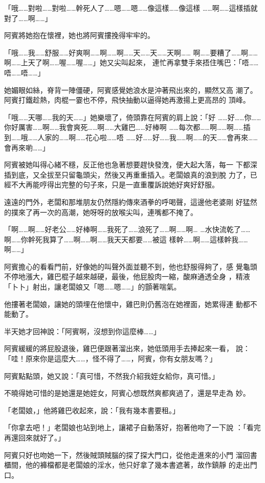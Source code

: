 「哦……對啦……對啦……幹死人了……嗯……嗯……像這樣……像這樣
……啊……這樣插就對了……啊……」

阿賓將她抱在懷裡，她也將阿賓摟挽得牢牢的。

「哦……我……舒服……好爽啊……啊……啊……天……天……天啊……
啊……要糟了……啊……啊……上天了啊……喔……喔……」她又尖叫起來，
連忙再拿雙手來捂住嘴巴：「唔……唔……唔……」

她媚眼如絲，脊背一陣僵硬，阿賓感覺她浪水是沖著飛出來的，顯然又高
潮了。阿賓打鐵趁熱，肉棍一霎也不停，飛快抽動以逼得她再激揚上更高昂的
頂峰。

「哦……天哪……我的天……」她樂壞了，倚頭靠在阿賓的肩上說：「好
……好……你……你好厲害……啊……我會爽死……啊……大雞巴……好棒啊
……每次都……啊……啊……插到……哦……人家的……啊……花心啦……唔
……好……好……我……啊……的天……會再來……會再來喲……」

阿賓被她叫得心緒不穩，反正他也急著想要趕快發洩，便大起大落，每一
下都深插到底，又全拔至只留龜頭尖，然後又再重重插入。老闆娘真的浪到脫
力了，已經不大再能哼得出完整的句子來，只是一直重覆訴說她好爽好舒服。

遠遠的門外，老闆和那堆朋友仍然隱約傳來酒拳的呼喝聲，這邊他老婆剛
好猛然的撲來了再一次的高潮，她呀呀的放喉尖叫，連嘴都不掩了。

「啊……啊……好老公……好棒啊……我死了……浪死了……啊……啊…
…水快流乾了……啊……你幹死我算了……啊……啊……我天天都要……被這
樣幹……啊……這樣幹我……啊……」

阿賓擔心的看看門前，好像她的叫聲外面並聽不到，他也舒服得夠了，感
覺龜頭不停地漲大，雞巴棍子越來越硬，最後，他屁股肉一縮，酸麻通透全身
，精液「卜卜」射出，讓老闆娘又「嗯……嗯……」的顫著喘氣。

他摟著老闆娘，讓她的頭埋在他懷中，雞巴則仍舊泡在她裡面，她累得連
動都不能動了。

半天她才回神說：「阿賓啊，沒想到你這麼棒……」

阿賓緩緩的將屁股退後，雞巴便跟著溜出來，她低頭用手去捧起來一看，
說：「哇！原來你是這麼大……，怪不得了……，阿賓，你有女朋友嗎？」

阿賓點點頭，她又說：「真可惜，不然我介紹我姪女給你，真可惜。」

不曉得她可惜的是她還是她姪女，阿賓心想既然爽都爽過了，還是早走為
妙。

「老闆娘，」他將雞巴收起來，說：「我有幾本書要租。」

「你拿去吧！」老闆娘也站到地上，讓裙子自動落好，抱著他吻了一下說
：「看完再還回來就好了。」

阿賓只好也吻她一下，然後賊頭賊腦的探了探大門口，從他走進來的小門
溜回書櫃間，他的褲檔都是老闆娘的淫水，他只好拿了幾本書遮著，故作鎮靜
的走出門口。

